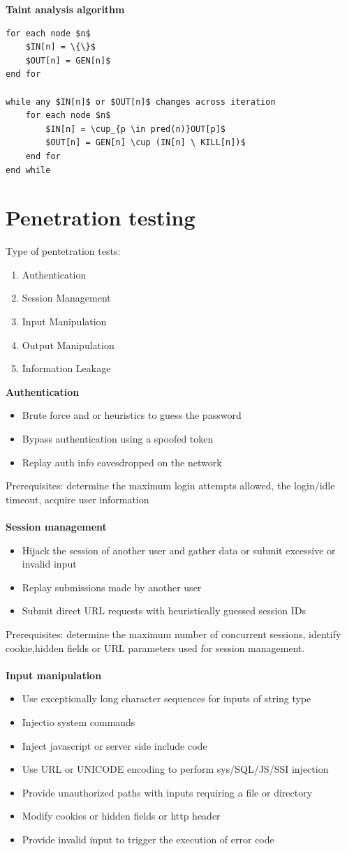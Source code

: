 \documentclass[10pt,a4paper]{article}
\begin{document}
\textbf{Taint analysis algorithm}
\begin{lstlisting}[frame=lines]
for each node $n$
	$IN[n] = \{\}$
	$OUT[n] = GEN[n]$
end for

while any $IN[n]$ or $OUT[n]$ changes across iteration
	for each node $n$
		$IN[n] = \cup_{p \in pred(n)}OUT[p]$
		$OUT[n] = GEN[n] \cup (IN[n] \ KILL[n])$
	end for
end while
\end{lstlisting}
\newpage
\section{Penetration testing}
Type of pentetration tests:
\begin{enumerate}
\item Authentication
\item Session Management
\item Input Manipulation
\item Output Manipulation
\item Information Leakage
\end{enumerate}
\textbf{Authentication}
\begin{itemize}
\item Brute force and or heuristics to guess the password
\item Bypass authentication using a spoofed token
\item Replay auth info eavesdropped on the network
\end{itemize} 
Prerequisites: determine the maximum login attempts allowed, the login/idle timeout, acquire user information\\\\
\textbf{Session management}
\begin{itemize}
\item Hijack the session of another user and gather data or submit excessive or invalid input
\item Replay submissions made by another user
\item Submit direct URL requests with heuristically guessed session IDs
\end{itemize}
Prerequisites: determine the maximum number of concurrent sessions, identify cookie,hidden fields or URL parameters used for session management.\\\\
\textbf{Input manipulation}\\
\begin{itemize}
\item Use exceptionally long character sequences for inputs of string type
\item Injectio system commands
\item Inject javascript or server side include code
\item Use URL or UNICODE encoding to perform sys/SQL/JS/SSI injection
\item Provide unauthorized paths with inputs requiring a file or directory
\item Modify cookies or hidden fields or http header
\item Provide invalid input to trigger the execution of error code
\end{itemize}
\end{document}
